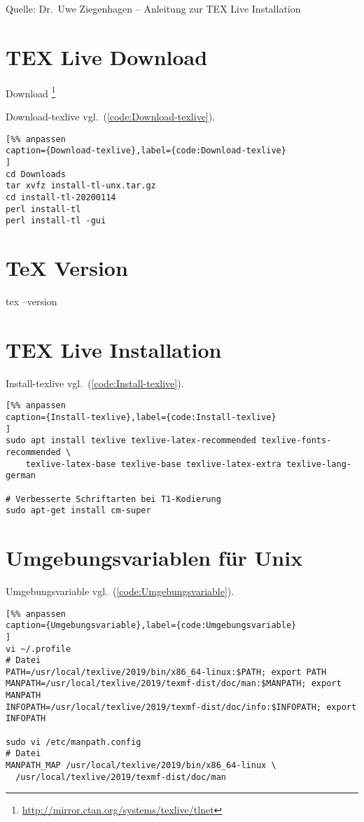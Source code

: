Quelle: Dr.~Uwe Ziegenhagen -- Anleitung zur TEX Live Installation

\section{TEX Live Download}\label{tex-live-download}

Download \footnote{\url{http://mirror.ctan.org/systems/texlive/tlnet}}

Download-texlive vgl.~(\autoref{code:Download-texlive}).

\lstset{language=C}%
\begin{lstlisting}[%% anpassen
caption={Download-texlive},label={code:Download-texlive}
]
cd Downloads
tar xvfz install-tl-unx.tar.gz
cd install-tl-20200114
perl install-tl
perl install-tl -gui
\end{lstlisting}

\section{TeX Version}\label{tex-version}

tex --version

\section{TEX Live Installation}\label{tex-live-installation}

Install-texlive vgl.~(\autoref{code:Install-texlive}).

\lstset{language=C}%
\begin{lstlisting}[%% anpassen
caption={Install-texlive},label={code:Install-texlive}
]
sudo apt install texlive texlive-latex-recommended texlive-fonts-recommended \
    texlive-latex-base texlive-base texlive-latex-extra texlive-lang-german

# Verbesserte Schriftarten bei T1-Kodierung
sudo apt-get install cm-super 
\end{lstlisting}

\section{Umgebungsvariablen für
Unix}\label{umgebungsvariablen-fuer-unix}

Umgebungsvariable vgl.~(\autoref{code:Umgebungsvariable}).

\lstset{language=C}%
\begin{lstlisting}[%% anpassen
caption={Umgebungsvariable},label={code:Umgebungsvariable}
]
vi ~/.profile
# Datei 
PATH=/usr/local/texlive/2019/bin/x86_64-linux:$PATH; export PATH
MANPATH=/usr/local/texlive/2019/texmf-dist/doc/man:$MANPATH; export MANPATH
INFOPATH=/usr/local/texlive/2019/texmf-dist/doc/info:$INFOPATH; export INFOPATH

sudo vi /etc/manpath.config
# Datei 
MANPATH_MAP /usr/local/texlive/2019/bin/x86_64-linux \
  /usr/local/texlive/2019/texmf-dist/doc/man  
\end{lstlisting}
